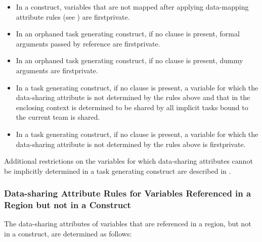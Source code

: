 {{{{\begin{itemize}
\item In a  construct, variables that are not mapped after applying data-mapping attribute rules (see ) are firstprivate.
\end{itemize}

\cppspecificstart
\begin{itemize}
\item In an orphaned task generating
construct, if no  clause is present, formal arguments passed by reference are firstprivate.
\end{itemize}
\cppspecificend

\fortranspecificstart
\begin{itemize}
\item In an orphaned task generating
construct, if no  clause is present, dummy arguments 
are firstprivate.
\end{itemize}
\fortranspecificend

\begin{itemize}
\item In a task generating construct, if no  clause is present, a variable
for which the data-sharing attribute is not determined by the rules above
and that in the enclosing context is determined to be shared by all implicit tasks bound
to the current team is shared.

\item In a task generating construct, if no
 clause is present, a variable for which the data-sharing 
attribute is not determined by the rules above is firstprivate.
\end{itemize}

Additional restrictions on the variables for which data-sharing attributes cannot be 
implicitly determined in a task generating construct are described in
.







\pagebreak

\subsubsection{Data-sharing Attribute Rules for Variables Referenced in a Region but not in a Construct}
\label{subsubsec:Data-sharing Attribute Rules for Variables Referenced in a Region but not in a Construct}
The data-sharing attributes of variables that are referenced in a region, but not in a 
construct, are determined as follows: 

}}}}
